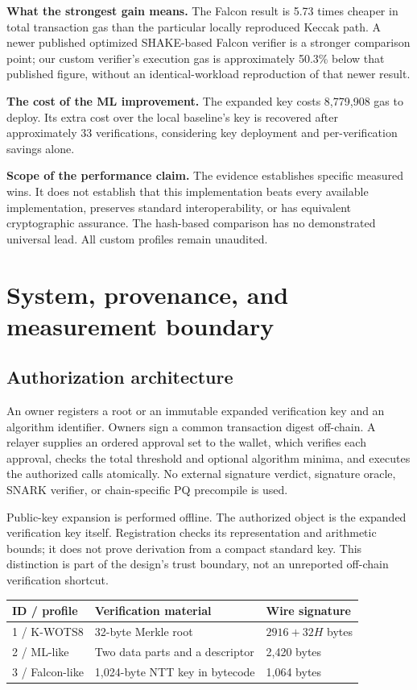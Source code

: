 \documentclass[11pt,a4paper]{article}
\newcommand{\callout}[1]{\par\smallskip\noindent\colorbox{pale}{\parbox{\dimexpr\linewidth-2\fboxsep\relax}{\small #1}}\par\smallskip}
\begin{document}
\textbf{What the strongest gain means.} The Falcon result is
5.73 times cheaper in total transaction gas than the particular
locally reproduced Keccak path. A newer published optimized SHAKE-based Falcon
verifier is a stronger comparison point; our custom verifier's execution gas
is approximately 50.3\% below that published figure, without an
identical-workload reproduction of that newer result.

\textbf{The cost of the ML improvement.} The expanded key costs
8,779,908 gas to deploy. Its extra cost over the local baseline's key
is recovered after approximately 33 verifications, considering key deployment
and per-verification savings alone.

\callout{\textbf{Scope of the performance claim.} The evidence establishes
specific measured wins. It does not establish that this implementation beats
every available implementation, preserves standard interoperability, or has
equivalent cryptographic assurance. The hash-based comparison has no
demonstrated universal lead. All custom profiles remain unaudited.}

\newpage
\section{System, provenance, and measurement boundary}
\subsection{Authorization architecture}
An owner registers a root or an immutable expanded verification key and an
algorithm identifier. Owners sign a common transaction digest off-chain. A
relayer supplies an ordered approval set to the wallet, which verifies each
approval, checks the total threshold and optional algorithm minima, and
executes the authorized calls atomically. No external signature verdict,
signature oracle, SNARK verifier, or chain-specific PQ precompile is used.

Public-key expansion is performed offline. The authorized object is the
expanded verification key itself. Registration checks its representation and
arithmetic bounds; it does not prove derivation from a compact standard key.
This distinction is part of the design's trust boundary, not an unreported
off-chain verification shortcut.

\begin{tabularx}{\linewidth}{lYY}
\toprule
\textbf{ID / profile} & \textbf{Verification material} & \textbf{Wire signature}\\
 / K-WOTS8 & 32-byte Merkle root & $2916+32H$ bytes\\
2 / ML-like & Two data parts and a descriptor & 2,420 bytes\\
3 / Falcon-like & 1,024-byte NTT key in bytecode & 1,064 bytes\\
\bottomrule
\end{tabularx}
\end{document}
